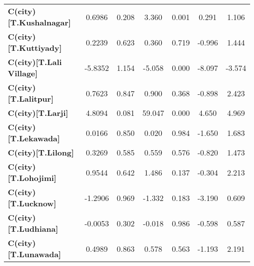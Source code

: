 \begin{center}
\begin{tabular}{lcccccc}
\textbf{C(city)[T.Kushalnagar]}                                                                     &       0.6986  &        0.208     &     3.360  &         0.001        &        0.291    &        1.106     \\
\textbf{C(city)[T.Kuttiyady]}                                                                       &       0.2239  &        0.623     &     0.360  &         0.719        &       -0.996    &        1.444     \\
\textbf{C(city)[T.Lali Village]}                                                                    &      -5.8352  &        1.154     &    -5.058  &         0.000        &       -8.097    &       -3.574     \\
\textbf{C(city)[T.Lalitpur]}                                                                        &       0.7623  &        0.847     &     0.900  &         0.368        &       -0.898    &        2.423     \\
\textbf{C(city)[T.Larji]}                                                                           &       4.8094  &        0.081     &    59.047  &         0.000        &        4.650    &        4.969     \\
\textbf{C(city)[T.Lekawada]}                                                                        &       0.0166  &        0.850     &     0.020  &         0.984        &       -1.650    &        1.683     \\
\textbf{C(city)[T.Lilong]}                                                                          &       0.3269  &        0.585     &     0.559  &         0.576        &       -0.820    &        1.473     \\
\textbf{C(city)[T.Lohojimi]}                                                                        &       0.9544  &        0.642     &     1.486  &         0.137        &       -0.304    &        2.213     \\
\textbf{C(city)[T.Lucknow]}                                                                         &      -1.2906  &        0.969     &    -1.332  &         0.183        &       -3.190    &        0.609     \\
\textbf{C(city)[T.Ludhiana]}                                                                        &      -0.0053  &        0.302     &    -0.018  &         0.986        &       -0.598    &        0.587     \\
\textbf{C(city)[T.Lunawada]}                                                                        &       0.4989  &        0.863     &     0.578  &         0.563        &       -1.193    &        2.191     \\

\end{tabular}
\end{center}
